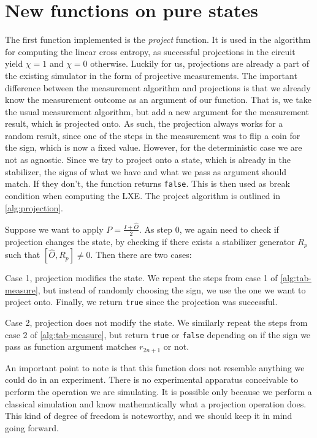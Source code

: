\section{New functions on pure states}
The first function implemented is the \emph{project} function. It is used in
the algorithm for computing the linear cross entropy, as successful projections
in the circuit yield $\chi = 1$ and $\chi = 0$ otherwise. Luckily for us,
projections are already a part of the existing simulator in the form of
projective measurements. The important difference between the measurement
algorithm and projections is that we already know the measurement outcome as an
argument of our function. That is, we take the usual measurement algorithm, but
add a new argument for the measurement result, which is projected onto. As
such, the projection always works for a random result, since one of the steps
in the measurement was to flip a coin for the sign, which is now a fixed value.
However, for the deterministic case we are not as agnostic. Since we try to
project onto a state, which is already in the stabilizer, the signs of what we
have and what we pass as argument should match. If they don't, the function
returns \verb|false|. This is then used as break condition when computing the
LXE. The project algorithm is outlined in
\cref{alg:projection}.
\begin{alg}\label{alg:projection}
  Suppose we want to apply $P = \frac{I + \hat{O}}{2}$. As step 0, we again
  need to check if projection changes the state,
   by checking if there exists a stabilizer generator $R_p$
  such that $[\hat{O},R_p]\neq 0$. Then there are two cases:

  Case 1, projection modifies the state. We repeat the steps from case 1 of
  \cref{alg:tab-measure}, but instead of randomly choosing the sign, we use the
  one we want to project onto. Finally, we return \verb|true| since the
  projection was successful.

  Case 2, projection does not modify the state. We similarly repeat the steps
  from case 2 of \cref{alg:tab-measure}, but return \verb|true| or \verb|false|
  depending on if the sign we pass as function argument matches $r_{2n+1}$ or
  not.
\end{alg}
An important point to note is that this function does not resemble anything we
could do in an experiment. There is no experimental apparatus conceivable to
perform the operation we are simulating. It is possible only because we
perform a classical simulation and know mathematically what a projection
operation does. This kind of degree of freedom is noteworthy, and we should
keep it in mind going forward.

